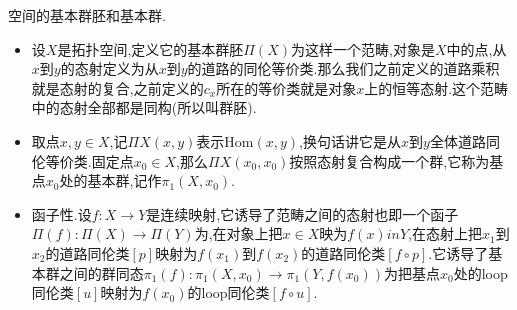 空间的基本群胚和基本群.
\begin{itemize}
	\item 设$X$是拓扑空间,定义它的基本群胚$\Pi(X)$为这样一个范畴,对象是$X$中的点,从$x$到$y$的态射定义为从$x$到$y$的道路的同伦等价类.那么我们之前定义的道路乘积就是态射的复合,之前定义的$c_x$所在的等价类就是对象$x$上的恒等态射.这个范畴中的态射全部都是同构(所以叫群胚).
	\item 取点$x,y\in X$,记$\Pi X(x,y)$表示$\mathrm{Hom}(x,y)$,换句话讲它是从$x$到$y$全体道路同伦等价类.固定点$x_0\in X$,那么$\Pi X(x_0,x_0)$按照态射复合构成一个群,它称为基点$x_0$处的基本群,记作$\pi_1(X,x_0)$.
	\item 函子性.设$f:X\to Y$是连续映射,它诱导了范畴之间的态射也即一个函子$\Pi(f):\Pi(X)\to\Pi(Y)$为,在对象上把$x\in X$映为$f(x)in Y$,在态射上把$x_1$到$x_2$的道路同伦类$[p]$映射为$f(x_1)$到$f(x_2)$的道路同伦类$[f\circ p]$.它诱导了基本群之间的群同态$\pi_1(f):\pi_1(X,x_0)\to\pi_1(Y,f(x_0))$为把基点$x_0$处的loop同伦类$[u]$映射为$f(x_0)$的loop同伦类$[f\circ u]$.
\end{itemize}
